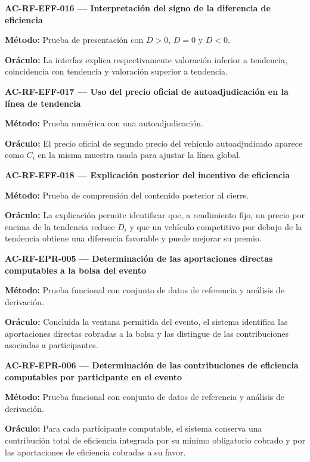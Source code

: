 \documentclass[10pt,letterpaper]{article}
\begin{document}
\noindent\textbf{AC-RF-EFF-016 --- Interpretación del signo de la diferencia de eficiencia}\par
\textbf{Método:} Prueba de presentación con $D>0$, $D=0$ y $D<0$.\par
\textbf{Oráculo:} La interfaz explica respectivamente valoración inferior a tendencia, coincidencia con tendencia y valoración superior a tendencia.\par\vspace{0.45em}
\noindent\textbf{AC-RF-EFF-017 --- Uso del precio oficial de autoadjudicación en la línea de tendencia}\par
\textbf{Método:} Prueba numérica con una autoadjudicación.\par
\textbf{Oráculo:} El precio oficial de segundo precio del vehículo autoadjudicado aparece como $C_i$ en la misma muestra usada para ajustar la línea global.\par\vspace{0.45em}
\noindent\textbf{AC-RF-EFF-018 --- Explicación posterior del incentivo de eficiencia}\par
\textbf{Método:} Prueba de comprensión del contenido posterior al cierre.\par
\textbf{Oráculo:} La explicación permite identificar que, a rendimiento fijo, un precio por encima de la tendencia reduce $D_i$ y que un vehículo competitivo por debajo de la tendencia obtiene una diferencia favorable y puede mejorar su premio.\par\vspace{0.45em}
\noindent\textbf{AC-RF-EPR-005 --- Determinación de las aportaciones directas computables a la bolsa del evento}\par
\textbf{Método:} Prueba funcional con conjunto de datos de referencia y análisis de derivación.\par
\textbf{Oráculo:} Concluida la ventana permitida del evento, el sistema identifica las aportaciones directas cobradas a la bolsa y las distingue de las contribuciones asociadas a participantes.\par\vspace{0.45em}
\noindent\textbf{AC-RF-EPR-006 --- Determinación de las contribuciones de eficiencia computables por participante en el evento}\par
\textbf{Método:} Prueba funcional con conjunto de datos de referencia y análisis de derivación.\par
\textbf{Oráculo:} Para cada participante computable, el sistema conserva una contribución total de eficiencia integrada por su mínimo obligatorio cobrado y por las aportaciones de eficiencia cobradas a su favor.\par\vspace{0.45em}
\end{document}
